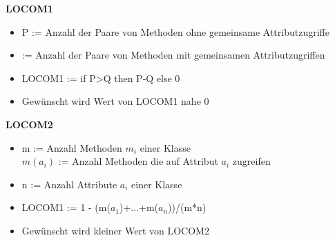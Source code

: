 \textbf{LOCOM1}
\begin{itemize}
	\item P := Anzahl der Paare von Methoden ohne gemeinsame Attributzugriffe
	\item  := Anzahl der Paare von Methoden mit gemeinsamen Attributzugriffen
	\item LOCOM1 := if P>Q then P-Q else 0
	\item Gewünscht wird Wert von LOCOM1 nahe 0
\end{itemize}
\textbf{LOCOM2}
\begin{itemize}
\item m := Anzahl Methoden $m_{i}$ einer Klasse \\
$m(a_{i})$ := Anzahl Methoden die auf Attribut $a_{i}$ zugreifen
\item  n := Anzahl Attribute $a_{i}$ einer Klasse
\item LOCOM1 := 1 - (m($a_{1}$)+...+m($a_{n}$))/(m*n)
\item Gewünscht wird kleiner Wert von LOCOM2
\end{itemize}

